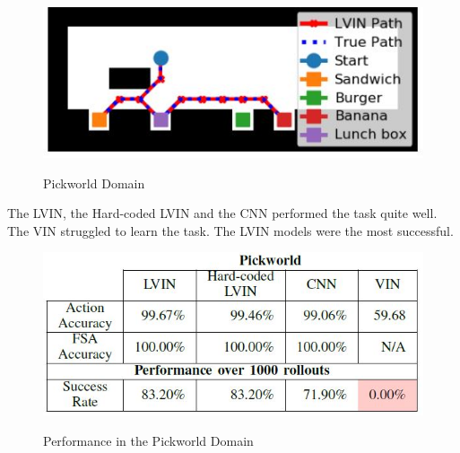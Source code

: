 \documentclass[letterpaper, 10 pt, conference]{ieeeconf}  %
\begin{document}
\begin{figure}[h]
 \centering
 \includegraphics[scale=.5]{Pickworld.JPG}\\
 \caption{Pickworld Domain}
\end{figure}

The LVIN, the Hard-coded LVIN and the CNN performed the task quite well. The VIN struggled to learn the task. The LVIN models were the most successful.

\begin{figure}[h]
 \centering
 \includegraphics[scale=.6]{PickworldResults.JPG}\\
 \caption{Performance in the Pickworld Domain}
\end{figure}
\end{document}
